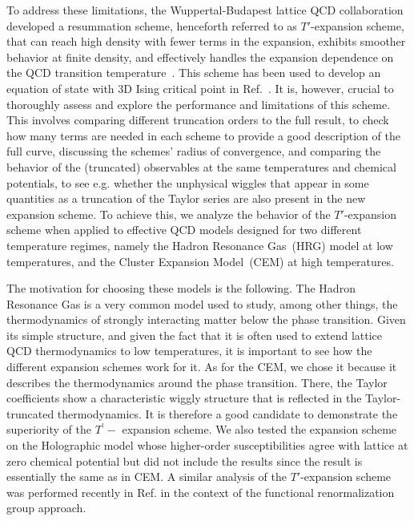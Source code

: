 \documentclass[%
 reprint,
nofootinbib,
 amsmath,amssymb,
 aps,
prc
]{revtex4-2}
\begin{document}
To address these limitations, the Wuppertal-Budapest lattice QCD collaboration developed a resummation scheme, henceforth referred to as $T'$-expansion scheme, that can reach high density with fewer terms in the expansion, exhibits smoother behavior at finite density, and effectively handles the expansion dependence on the QCD transition temperature~\cite{Borsanyi:2021sxv,Borsanyi:2022qlh}. This scheme has been used to develop an equation of state with 3D Ising critical point in Ref.~\cite{Kahangirwe:2024cny}. 
It is, however, crucial to thoroughly assess and explore the performance and limitations of this scheme. This involves comparing different truncation orders to the full result, to check how many terms are needed in each scheme to provide a good description of the full curve, discussing the schemes' radius of convergence, and comparing the behavior of the (truncated) observables at the same temperatures and chemical potentials, to see e.g. whether the unphysical wiggles that appear in some quantities as a truncation of the Taylor series are also present in the new expansion scheme.
To achieve this, we analyze the behavior of the  $T'$-expansion scheme when applied to effective QCD models designed for two different temperature regimes, namely the Hadron Resonance Gas~(HRG) model at low temperatures, and the Cluster Expansion Model~(CEM) at high temperatures.

The motivation for choosing these models is the following. The Hadron Resonance Gas is a very common model used to study, among other things, the thermodynamics of strongly interacting matter below the phase transition. Given its simple structure, and given the fact that it is often used to extend lattice QCD thermodynamics to low temperatures, it is important to see how the different expansion schemes work for it. 
As for the CEM, we chose it because it describes the thermodynamics around the phase transition. 
There, the Taylor coefficients show a characteristic wiggly structure that is reflected in the Taylor-truncated thermodynamics. It is therefore a good candidate to demonstrate the superiority of the $ T^\prime-$ expansion scheme. We also tested the expansion scheme on the Holographic model \cite{Hippert:2023bel} whose higher-order susceptibilities agree with lattice at zero chemical potential but did not include the results since the result is essentially the same as in CEM.
A similar analysis of the $T'$-expansion scheme was performed recently in Ref. \cite{Wen:2024hbz} in the context of the functional renormalization group approach.
\end{document}
